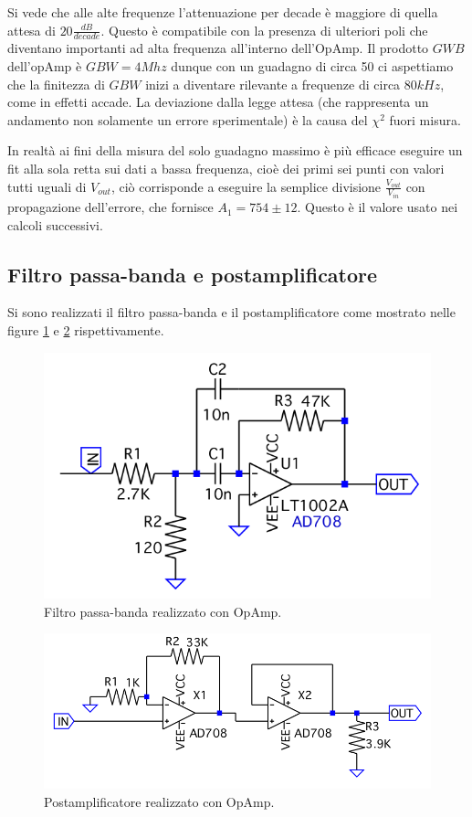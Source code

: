 \documentclass[10pt,a4paper]{article}
\begin{document}
Si vede che alle alte frequenze l'attenuazione per decade è maggiore di quella attesa di $20\frac{dB}{decade}$. Questo è compatibile con la presenza di ulteriori poli che diventano importanti ad alta frequenza all'interno dell'OpAmp. Il prodotto $GWB$ dell'opAmp è $GBW = 4 Mhz$ dunque con un guadagno di circa 50 ci aspettiamo che la finitezza di $GBW$ inizi a diventare rilevante a frequenze di circa $80 kHz$, come in effetti accade. La deviazione dalla legge attesa (che rappresenta un andamento non solamente un errore sperimentale) è la causa del $\chi^2$ fuori misura.

In realtà ai fini della misura del solo guadagno massimo è più efficace eseguire un fit alla sola retta sui dati a bassa frequenza, cioè dei primi sei punti con valori tutti uguali di $V_{out}$, ciò corrisponde a eseguire la semplice divisione $\frac{V_{out}}{V_{in}}$ con propagazione dell'errore, che fornisce $A_1 = 754 \pm 12$. Questo è il valore usato nei calcoli successivi.

\subsection{Filtro passa-banda e postamplificatore}
Si sono realizzati il filtro passa-banda e il postamplificatore come mostrato nelle figure \ref{banda} e \ref{postamp} rispettivamente.

\begin{figure}[!htb]
\centering
\includegraphics[scale=0.5]{banda.png}
\caption{Filtro passa-banda realizzato con OpAmp.\label{banda}}
\end{figure}


\begin{figure}[!htb]
\centering
\includegraphics[scale=0.5]{postamp.png}
\caption{Postamplificatore realizzato con OpAmp.\label{postamp}}
\end{figure}
\end{document}
